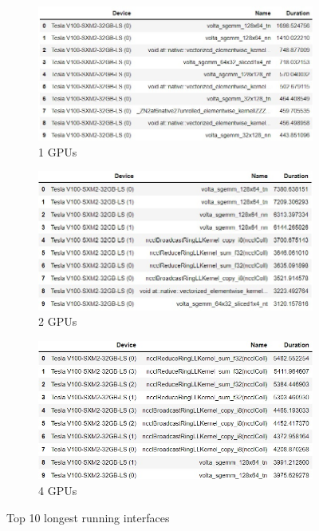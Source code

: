 \begin{figure}[htbp]
    \centering
    \begin{subfigure}{.5\textwidth}
        \centering
        \includegraphics[width=\linewidth]{fig/gpt2/gpt_t1.jpg}
        \caption{1 GPUs}
        \label{fig:gpt2:timegroup}
    \end{subfigure}%
    \begin{subfigure}{.5\textwidth}
        \centering
        \includegraphics[width=\linewidth]{fig/gpt2/gpt_t2.jpg}
        \caption{2 GPUs}
        \label{fig:gpt2:timegroup_frac}
    \end{subfigure}
    \begin{subfigure}{.6\textwidth}
        \centering
        \includegraphics[width=\linewidth]{fig/gpt2/gpt_t4.jpg}
        \caption{4 GPUs}
        \label{fig:gpt2:timegroup_frac}
    \end{subfigure}    
    \caption{Top 10 longest running interfaces}
\label{fig:gpt2:tg}
\end{figure}

